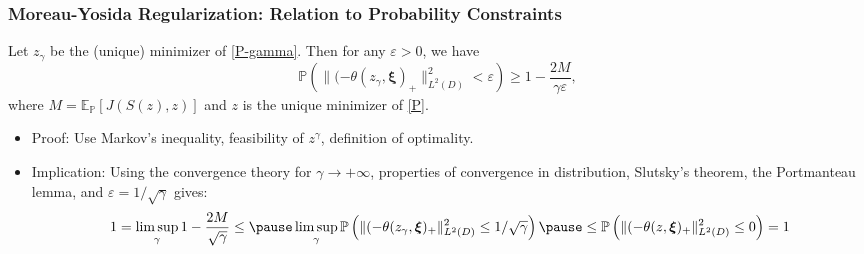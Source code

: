 \documentclass[aspectratio=169,xcolor=dvipsnames,11pt]{beamer}
\newcommand{\xibold}{\mathbold{\xi}}
\begin{document}
\begin{footnotesize}
\begin{frame}\frametitle{Moreau-Yosida Regularization: Relation to Probability Constraints}
\begin{theorem}\label{prop:markov}
Let $z_{\gamma}$ be the (unique) minimizer of \eqref{P-gamma}. Then for any $\varepsilon > 0$, we have
 \begin{equation*}
  \mathbb P \left(  \| (-\theta(z_{\gamma},\xibold)_+ \|^2_{L^2(D)} < \varepsilon \right) \geq 1 - \frac{2M}{\gamma \varepsilon},
 \end{equation*}
where $M = \mathbb{E}_{\mathbb P}\left[ J(S(z),z)\right] $ and $z$ is the unique minimizer of \eqref{P}.
\end{theorem}
\begin{itemize}
\item Proof: Use Markov's inequality, feasibility of $z^{\gamma}$, definition of optimality.\pause
\item Implication: Using the convergence theory for $\gamma \to +\infty$, properties of convergence in distribution, Slutsky's theorem, the Portmanteau lemma, and $\varepsilon = 1/\sqrt{\gamma}$ gives:
\[
 1 = \limsup_{\gamma} 1 - \frac{2M}{\sqrt{\gamma}} \le \pause \limsup_{\gamma} \mathbb P \left(  \| (-\theta(z_{\gamma},\xibold)_+ \|^2_{L^2(D)} \le 1/\sqrt{\gamma} \right)\pause \le  \mathbb P \left(  \| (-\theta(z,\xibold)_+ \|^2_{L^2(D)} \le 0\right) = 1
\]\pause
\end{itemize}
\end{frame}


\end{footnotesize}
\end{document}
